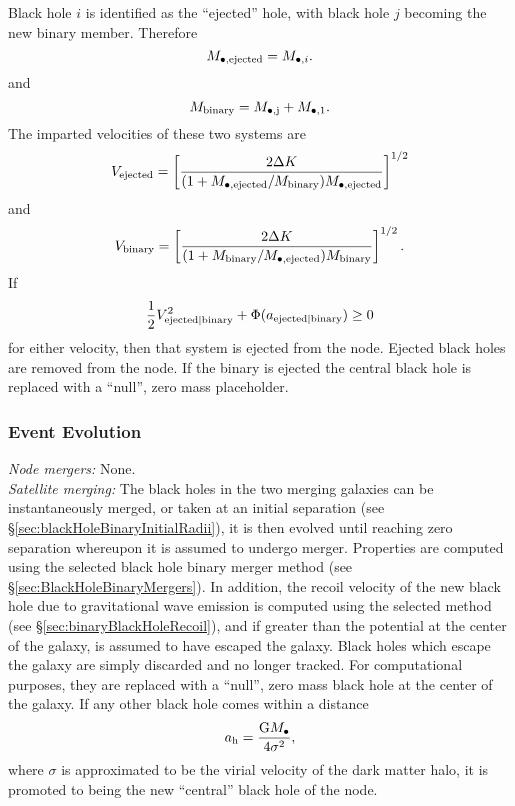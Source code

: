 Black hole $i$ is identified as the ``ejected'' hole, with black hole $j$ becoming the new binary member. Therefore
\begin{equation}
 M_{\bullet, \rm ejected} = M_{\bullet, i}.
\end{equation}
and
\begin{equation}
 M_{\rm binary} = M_{\rm \bullet, j} + M_{\rm \bullet, 1}.
\end{equation}
The imparted velocities of these two systems are
\begin{equation}
 V_{\rm ejected} = \left[ {2 \Delta K \over (1+M_{\bullet, \rm ejected}/M_{\rm binary} ) M_{\bullet, \rm ejected} }\right]^{1/2}
\end{equation}
and
\begin{equation}
 V_{\rm binary} = \left[ {2 \Delta K \over (1+M_{\rm binary} /M_{\bullet, \rm ejected}) M_{\rm binary}}\right]^{1/2}.
\end{equation}
If
\begin{equation}
 \frac{1}{2} V_{\rm ejected|binary}^2 + \Phi(a_{\rm ejected|binary}) \ge 0
\end{equation}
for either velocity, then that system is ejected from the node. Ejected black holes are removed from the node. If the binary is ejected the central black hole is replaced with a ``null'', zero mass placeholder.

\subsubsection{Event Evolution}

\noindent\emph{Node mergers:} None.\\

\noindent\emph{Satellite merging:} The black holes in the two merging galaxies can be instantaneously merged, or taken at an initial separation (see \S\ref{sec:blackHoleBinaryInitialRadii}), it is then evolved until reaching zero separation whereupon it is assumed to undergo merger. Properties are computed using the selected black hole binary merger method (see \S\ref{sec:BlackHoleBinaryMergers}). In addition, the recoil velocity of the new black hole due to gravitational wave emission is computed using the selected method (see \S\ref{sec:binaryBlackHoleRecoil}), and if greater than the potential at the center of the galaxy, is assumed to have escaped the galaxy. Black holes which escape the galaxy are simply discarded and no longer tracked. For computational purposes, they are replaced with a ``null'', zero mass black hole at the center of the galaxy. If any other black hole comes within a distance 
\begin{equation}
a_{\rm h} = {{\rm G} M_\bullet \over 4 \sigma^2},
\end{equation}
where $\sigma$ is approximated to be the virial velocity of the dark matter halo, it is promoted to being the new ``central'' black hole of the node.\\

